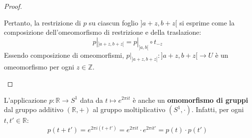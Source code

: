 \begin{ejemplo}
\begin{proof}
\begin{itemize}
    Pertanto, la restrizione di $p$ su ciascun foglio $]a+z, b+z[$ si esprime come la composizione dell'omeomorfismo di restrizione e della traslazione:
    \[
    p|_{]a+z, b+z[} = p|_{]a,b[} \circ t_{-z}
    \]
    Essendo composizione di omeomorfismi, $p|_{]a+z, b+z[}: ]a+z, b+z[ \to U$ è un omeomorfismo per ogni $z \in \mathbb{Z}$.
\end{itemize}
\end{proof}

\begin{observacion}
L'applicazione $p: \mathbb{R} \to S^1$ data da $t \mapsto e^{2\pi i t}$ è anche un \textbf{omomorfismo di gruppi} dal gruppo additivo $(\mathbb{R}, +)$ al gruppo moltiplicativo $(S^1, \cdot)$.
Infatti, per ogni $t, t' \in \mathbb{R}$:
\[
p(t + t') = e^{2\pi i (t + t')} = e^{2\pi i t} \cdot e^{2\pi i t'} = p(t) \cdot p(t')
\]
\end{observacion}
\end{ejemplo}

\vspace{1.5em}

